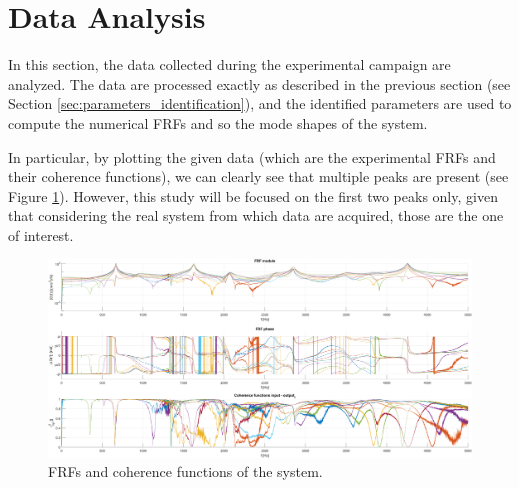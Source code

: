 \section{Data Analysis}
\label{sec:data_analysis}

In this section, the data collected during the experimental campaign are analyzed.
The data are processed exactly as described in the previous section (see Section \ref{sec:parameters_identification}), and the identified parameters are used to compute the numerical FRFs and so the mode shapes of the system.

In particular, by plotting the given data (which are the experimental FRFs and their coherence functions), we can clearly see that multiple peaks are present (see Figure \ref{fig:FRFs_part_B}).
However, this study will be focused on the first two peaks only, given that considering the real system from which data are acquired, those are the one of interest.

\begin{figure}[H]
    \centering
    \includegraphics[width=\textwidth]{img/MATLAB/Part_B/Experimental_data.png}
    \caption{FRFs and coherence functions of the system.}
    \label{fig:FRFs_part_B}
\end{figure}



